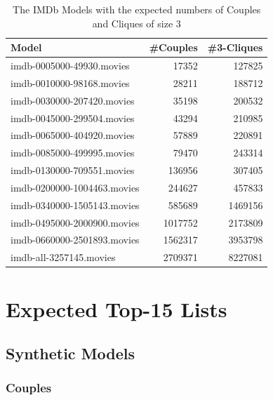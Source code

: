 \documentclass[a4paper,11pt]{article}
\newcommand{\p}[1]{\textsf{\small #1}}
\begin{document}
\begin{table}[!ht]
  \centering
  \begin{tabular}{| l | r | r |}
    \hline
    \textbf{Model}                  & \textbf{\#Couples} & \textbf{\#3-Cliques}\\
    \hline
    \p{imdb-0005000-49930.movies}   & 17352              & 127825\\
    \p{imdb-0010000-98168.movies}   & 28211              & 188712\\
    \p{imdb-0030000-207420.movies}  & 35198              & 200532\\
    \p{imdb-0045000-299504.movies}  & 43294              & 210985\\
    \p{imdb-0065000-404920.movies}  & 57889              & 220891\\
    \p{imdb-0085000-499995.movies}  & 79470              & 243314\\
    \p{imdb-0130000-709551.movies}  & 136956             & 307405\\
    \p{imdb-0200000-1004463.movies} & 244627             & 457833\\
    \p{imdb-0340000-1505143.movies} & 585689             & 1469156\\
    \p{imdb-0495000-2000900.movies} & 1017752            & 2173809\\
    \p{imdb-0660000-2501893.movies} & 1562317            & 3953798\\
    \p{imdb-all-3257145.movies}     & 2709371            & 8227081\\
    \hline
  \end{tabular}
  \caption{The IMDb Models with the expected numbers of Couples and Cliques of size 3}
  \label{tab:imdb-numbers}
\end{table}

\newpage
\section{Expected Top-15 Lists}
\label{sec:top-15}

\subsection{Synthetic Models}
\label{sec:top-15:synthetic-models}

\subsubsection{Couples}
\end{document}

